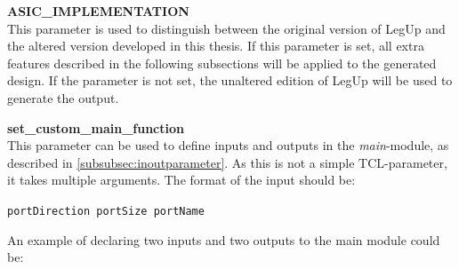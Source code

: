 \begin{description}
\item{\textbf{ASIC\_IMPLEMENTATION}} \hfill \\
This parameter is used to distinguish between the original version of LegUp and the altered version developed in this thesis. If this parameter is set, all extra features described in the following subsections will be applied to the generated design. If the parameter is not set, the unaltered edition of LegUp will be used to generate the output.
\item{\textbf{set\_custom\_main\_function}} \hfill \\
This parameter can be used to define inputs and outputs in the \textit{main}-module, as described in \cref{subsubsec:inoutparameter}. As this is not a simple TCL-parameter, it takes multiple arguments. The format of the input should be: 

\verb!portDirection portSize portName!

An example of declaring two inputs and two outputs to the main module could be:


\end{description}
